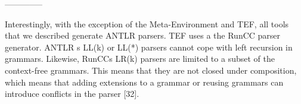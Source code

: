 --------------

Interestingly, with the exception of the Meta-Environment
and TEF, all tools that we described generate ANTLR
parsers. TEF uses a the RunCC parser generator. ANTLR s
LL(k) or LL(*) parsers cannot cope with left recursion in
grammars. Likewise, RunCCs LR(k) parsers are limited to
a subset of the context-free grammars. This means that they
are not closed under composition, which means that adding
extensions to a grammar or reusing grammars can introduce
conflicts in the parser [32]. 